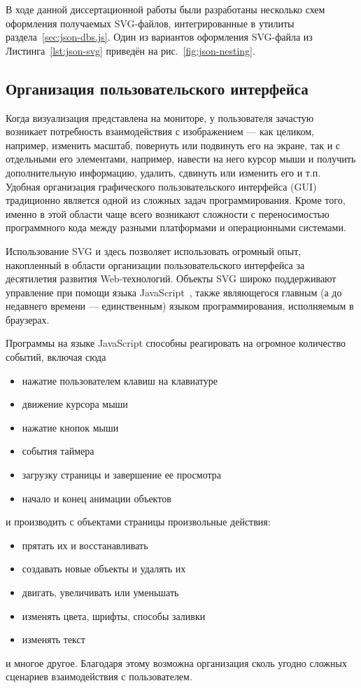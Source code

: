 В ходе данной диссертационной работы
были разработаны несколько схем
оформления получаемых SVG-файлов,
интегрированные в утилиты раздела~\ref{sec:json-dbs.js}.
Один из вариантов оформления
SVG-файла из Листинга~\ref{lst:json-svg}
приведён на рис.~\ref{fig:json-nesting}.

\subsection{%
Организация пользовательского интерфейса
}

Когда визуализация представлена на мониторе,
у пользователя зачастую возникает потребность
взаимодействия с изображением ---
как целиком,
например, изменить масштаб,
повернуть или подвинуть его на экране,
так и с отдельными его элементами,
например, навести на него курсор мыши
и получить дополнительную информацию,
удалить, сдвинуть или изменить его
и т.п.
Удобная организация графического
пользовательского интерфейса
(GUI)
традиционно является одной из сложных
задач программирования.
Кроме того,
именно в этой области
чаще всего возникают сложности
с переносимостью программного кода
между разными платформами и операционными системами.

Использование SVG
и здесь позволяет использовать
огромный опыт,
накопленный в области организации пользовательского интерфейса
за десятилетия развития Web-технологий.
Объекты SVG
широко поддерживают управление при помощи языка
JavaScript~\cite{bi:JavaScript},
также являющегося главным
(а до недавнего времени --- единственным)
языком программирования,
исполняемым в браузерах.

Программы на языке JavaScript
способны реагировать на огромное количество событий,
включая сюда
\begin{itemize}
  \item нажатие пользователем клавиш на клавиатуре
  \item движение курсора мыши
  \item нажатие кнопок мыши
  \item события таймера
  \item загрузку страницы и завершение ее просмотра
  \item начало и конец анимации объектов
\end{itemize}
и производить с объектами страницы произвольные действия:
\begin{itemize}
  \item прятать их и восстанавливать
  \item создавать новые объекты и удалять их
  \item двигать, увеличивать или уменьшать
  \item изменять цвета, шрифты, способы заливки
  \item изменять текст
\end{itemize}
и многое другое.
Благодаря этому возможна организация сколь угодно
сложных сценариев взаимодействия с пользователем.

